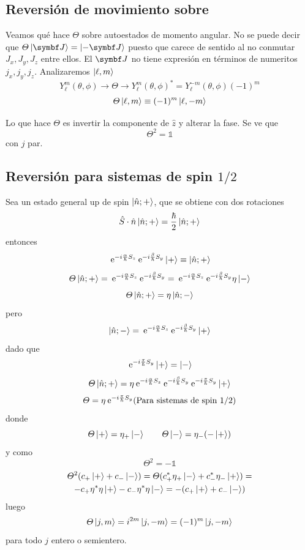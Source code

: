 \documentclass[10pt,oneside]{CBFT_book}
\begin{document}
\subsection{Reversión de movimiento sobre }

Veamos qué hace $\Theta$ sobre autoestados de momento angular. No se puede decir que
$\Theta \Ket{\vb{J}} = \Ket{-\vb J}$ puesto que carece de sentido al no conmutar $J_x,J_y,J_z$ entre ellos.
El $\vb J$ no tiene expresión en términos de numeritos $j_x, j_y, j_z$.
Analizaremos $\Ket{\ell,m}$
\[
	Y_\ell^m(\theta,\phi) \longrightarrow\Theta\longrightarrow Y_\ell^m(\theta,\phi)^* =
	Y_\ell^{-m}(\theta,\phi)(-1)^m
\]
\[
	\Theta \Ket{\ell,m} \equiv (-1)^m \Ket{\ell,-m}
\]

Lo que hace $\Theta$ es invertir la componente de $\hat{z}$ y alterar la fase. Se ve que 
\[
	\Theta^2 = \mathbb{1}
\]
con $j$ par.

\subsection{Reversión para sistemas de spin $1/2$}

Sea un estado general up de spin $\Ket{\hat{n};+}$, que se obtiene con dos rotaciones 
\[
	\hat{S}\cdot\hat{n} \Ket{\hat{n};+} = \frac{\hbar}{2} \Ket{\hat{n};+}
\]
entonces
\[
	\:\mathrm{e}^{-i\frac{\alpha}{\hbar}S_z}\:\mathrm{e}^{-i\frac{\beta}{\hbar}S_y} \Ket{+} \equiv
	 \Ket{\hat{n};+}
\]
\[
	\Theta \Ket{\hat{n};+} = \:\mathrm{e}^{-i\frac{\alpha}{\hbar}S_z}\:\mathrm{e}^{-i\frac{\beta}{\hbar}S_y} =
	\:\mathrm{e}^{-i\frac{\alpha}{\hbar}S_z}\:\mathrm{e}^{-i\frac{\beta}{\hbar}S_y} \eta\Ket{-}
\]
\[
	\Theta \Ket{\hat{n};+} = \eta \Ket{\hat{n};-}
\]
pero 
\[
	\Ket{\hat{n};-} = \:\mathrm{e}^{-i\frac{\alpha}{\hbar}S_z}\:\mathrm{e}^{-i\frac{\beta}{\hbar}S_y}\Ket{+}
\]
dado que 
\[
	 \:\mathrm{e}^{-i\frac{\pi}{\hbar}S_y} \Ket{+} = \Ket{-}
\]
\[
	\Theta \Ket{\hat{n};+} = \eta \:\mathrm{e}^{-i\frac{\alpha}{\hbar}S_z}\:\mathrm{e}^{-i\frac{\beta}{\hbar}S_y}
	\:\mathrm{e}^{-i\frac{\pi}{\hbar}S_y} \Ket{+}
\]
\[
	\Theta = \eta \:\mathrm{e}^{-i\frac{\pi}{\hbar}S_y} \text{(Para sistemas de spin 1/2)}
\]
donde 
\[
	\Theta\Ket{+} = \eta_+ \Ket{-} \qquad \Theta\Ket{-} = \eta_- (-\Ket{+})
\]
y como
\[
	\Theta^2 = -\mathbb{1}
\]
\begin{multline*}
	\Theta^2 ( c_+\Ket{+} + c_-\Ket{-}) = \Theta ( c_+^*\eta_+\Ket{-} + c_-^*\eta_-\Ket{+}) = \\
	-c_+\eta^*\eta \Ket{+} - c_-\eta^*\eta \Ket{-} = -( c_+\Ket{+} + c_-\Ket{-}) 
\end{multline*}
luego
\[
	\Theta\Ket{j,m} = i^{2m} \Ket{j,-m} = (-1)^m \Ket{j,-m}
\]
para todo $j$ entero o semientero.
\end{document}
